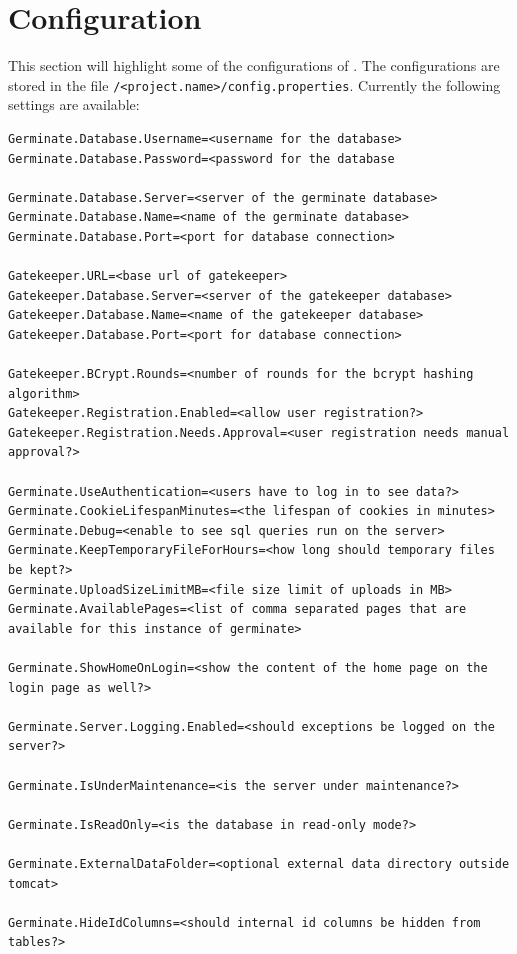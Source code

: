 \section{Configuration}
\label{sec:config}
This section will highlight some of the configurations of {\germinate}. The configurations are stored in the file \texttt{\instanceStuff/<project.name>/config.properties}. Currently the following settings are available:

\begin{lstlisting}[style=Properties]
Germinate.Database.Username=<username for the database>
Germinate.Database.Password=<password for the database

Germinate.Database.Server=<server of the germinate database>
Germinate.Database.Name=<name of the germinate database>
Germinate.Database.Port=<port for database connection>

Gatekeeper.URL=<base url of gatekeeper>
Gatekeeper.Database.Server=<server of the gatekeeper database>
Gatekeeper.Database.Name=<name of the gatekeeper database>
Gatekeeper.Database.Port=<port for database connection>

Gatekeeper.BCrypt.Rounds=<number of rounds for the bcrypt hashing algorithm>
Gatekeeper.Registration.Enabled=<allow user registration?>
Gatekeeper.Registration.Needs.Approval=<user registration needs manual approval?>

Germinate.UseAuthentication=<users have to log in to see data?>
Germinate.CookieLifespanMinutes=<the lifespan of cookies in minutes>
Germinate.Debug=<enable to see sql queries run on the server>
Germinate.KeepTemporaryFileForHours=<how long should temporary files be kept?>
Germinate.UploadSizeLimitMB=<file size limit of uploads in MB>
Germinate.AvailablePages=<list of comma separated pages that are available for this instance of germinate>

Germinate.ShowHomeOnLogin=<show the content of the home page on the login page as well?>

Germinate.Server.Logging.Enabled=<should exceptions be logged on the server?>

Germinate.IsUnderMaintenance=<is the server under maintenance?>

Germinate.IsReadOnly=<is the database in read-only mode?>

Germinate.ExternalDataFolder=<optional external data directory outside tomcat>

Germinate.HideIdColumns=<should internal id columns be hidden from tables?>


\end{lstlisting}
